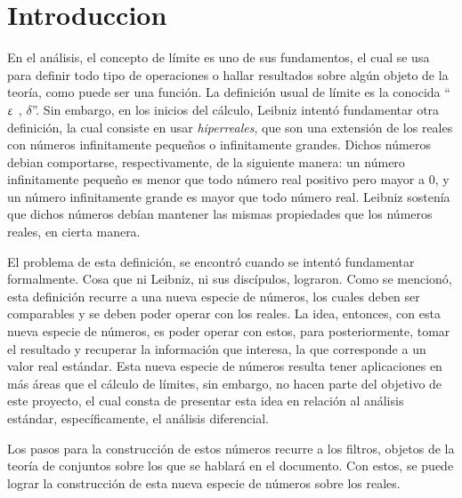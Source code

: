 \section{Introduccion}

En el análisis, el concepto de límite es uno de sus fundamentos,
el cual se usa para definir todo tipo de operaciones o hallar
resultados sobre algún objeto de la teoría, como puede ser una
función. La definición usual de límite es la conocida
``$\upvarepsilon$ , $\delta$''. Sin embargo, en los inicios del cálculo,
Leibniz intentó fundamentar otra definición, la cual consiste en
usar \emph{hiperreales}, que son una extensión de los reales con
números infinitamente pequeños o infinitamente grandes. Dichos números
debian comportarse, respectivamente, de la siguiente manera: un número
infinitamente pequeño es menor que todo número real positivo
pero mayor a $0$, y un número infinitamente grande es mayor que todo
número real. Leibniz sostenía que dichos números debían mantener las
mismas propiedades que los números reales, en cierta manera.

El problema de esta definición, se encontró cuando se intentó fundamentar
formalmente. Cosa que ni Leibniz, ni sus discípulos, lograron.
Como se mencionó, esta definición recurre a una nueva especie de números, los cuales
deben ser comparables y se deben poder operar con los reales. La idea,
entonces, con esta nueva especie de números, es poder operar con estos,
para posteriormente, tomar el resultado y recuperar la información que interesa,
la que corresponde a un valor real estándar. Esta nueva especie de números
resulta tener aplicaciones en más áreas que el cálculo de límites, sin
embargo, no hacen parte del objetivo de este proyecto, el cual consta de
presentar esta idea en relación al análisis estándar, específicamente,
el análisis diferencial.

Los pasos para la construcción de estos números recurre a los filtros,
objetos de la teoría de conjuntos sobre los que se hablará en el
documento. Con estos, se puede lograr la construcción de esta nueva especie
de números sobre los reales.
